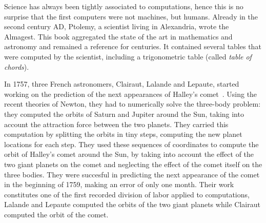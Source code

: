 \label{chapter:introduction}

\label{chapter:context}


    \label{sec:first_computers}

        Science has always been tightly associated to computations, hence this is no surprise that the first computers
        were not machines, but humans. Already in the second century AD, Ptolemy, a scientist living in Alexandria,
        wrote the Almagest. This book aggregated the state of the art in mathematics and astronomy and remained a
        reference for centuries. It contained several tables that were computed by the scientist, including a
        trigonometric table (called \emph{table of chords}).

        In 1757, three French astronomers, Clairaut, Lalande and Lepaute, started working on the prediction of the next
        appearances of Halley's comet~\cite[Chapter~1]{human_computers}. Using the recent theories of Newton, they had
        to numerically solve the three-body problem: they computed the orbits of Saturn and Jupiter around the Sun,
        taking into account the attraction force between the two planets. They carried this computation by splitting the
        orbits in tiny steps, computing the new planet locations for each step. They used these sequences of coordinates
        to compute the orbit of Halley's comet around the Sun, by taking into account the effect of the two giant
        planets on the comet and neglecting the effect of the comet itself on the three bodies. They were succesful in
        predicting the next appearance of the comet in the beginning of 1759, making an error of only one month. Their
        work constitutes one of the first recorded division of labor applied to computations, Lalande and Lepaute
        computed the orbits of the two giant planets while Clairaut computed the orbit of the comet.

